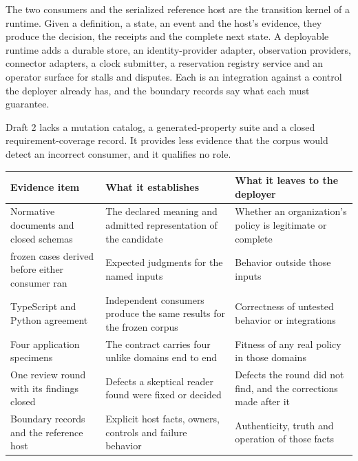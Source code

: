 \documentclass[
  american,
  11pt,
  letterpaper,
]{article}
\newcounter{none} %
\begin{document}
The two consumers and the serialized reference host are the transition
kernel of a runtime. Given a definition, a state, an event and the
host's evidence, they produce the decision, the receipts and the
complete next state. A deployable runtime adds a durable store, an
identity-provider adapter, observation providers, connector adapters, a
clock submitter, a reservation registry service and an operator surface
for stalls and disputes. Each is an integration against a control the
deployer already has, and the boundary records say what each must
guarantee.

Draft 2 lacks a mutation catalog, a generated-property suite and a
closed requirement-coverage record. It provides less evidence that the
corpus would detect an incorrect consumer, and it qualifies no role.

{\def\LTcaptype{none} %
\begin{longtable}[]{@{}
  >{\raggedright\arraybackslash}p{}
  >{\raggedright\arraybackslash}p{}
  >{\raggedright\arraybackslash}p{}@{}}
\toprule\noalign{}
\begin{minipage}[b]{\linewidth}\raggedright
Evidence item
\end{minipage} & \begin{minipage}[b]{\linewidth}\raggedright
What it establishes
\end{minipage} & \begin{minipage}[b]{\linewidth}\raggedright
What it leaves to the deployer
\end{minipage} \\
\midrule\noalign{}
\endhead
\bottomrule\noalign{}
\endlastfoot
Normative documents and closed schemas & The declared meaning and
admitted representation of the candidate & Whether an organization's
policy is legitimate or complete \\
425 frozen cases derived before either consumer ran & Expected judgments
for the named inputs & Behavior outside those inputs \\
TypeScript and Python agreement & Independent consumers produce the same
results for the frozen corpus & Correctness of untested behavior or
integrations \\
Four application specimens & The contract carries four unlike domains
end to end & Fitness of any real policy in those domains \\
One review round with its findings closed & Defects a skeptical reader
found were fixed or decided & Defects the round did not find, and the
corrections made after it \\
Boundary records and the reference host & Explicit host facts, owners,
controls and failure behavior & Authenticity, truth and operation of
those facts \\
\end{longtable}
}
\end{document}
